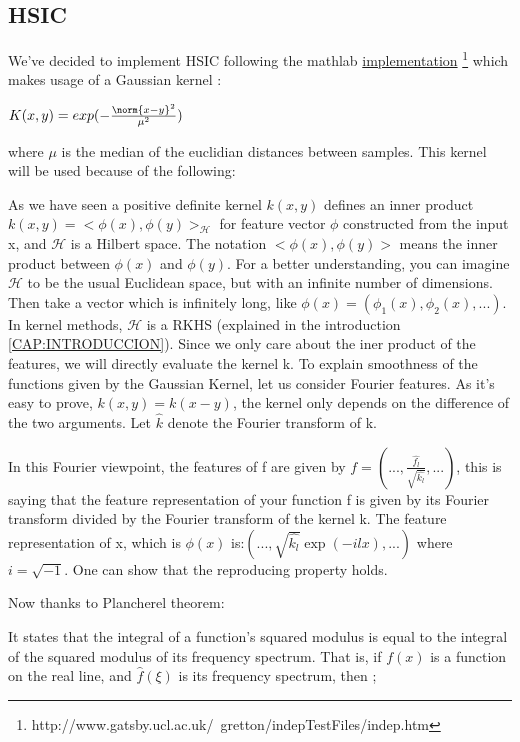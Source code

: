 \subsection{HSIC}

We've decided to implement HSIC following the mathlab \href{http://www.gatsby.ucl.ac.uk/~gretton/indepTestFiles/indep.htm#GreEtAl10}{implementation} \footnote{http://www.gatsby.ucl.ac.uk/~gretton/indepTestFiles/indep.htm} which makes usage of a Gaussian kernel :

$K(x,y) = exp(-\frac{\norm{x-y}^{2}}{\mu^{2}})$

where $\mu$ is the median of the euclidian distances between samples.
This kernel will be used because of the following:

As we have seen a positive definite kernel $k(x,y)$ defines an inner product $k(x,y) = <\phi(x),\phi(y)>_{\mathcal{H}}$ for feature vector $\phi$ constructed from the input x, and $\mathcal{H}$ is a Hilbert space. The notation $<\phi(x),\phi(y)>$ means the inner product between $\phi(x)$ and $\phi(y)$.
For a better understanding, you can imagine $\mathcal{H}$ to be the usual Euclidean space, but with an infinite number of dimensions. Then take a vector which is infinitely long, like $\phi(x) = (\phi_{1}(x),\phi_{2}(x),...)$. In kernel methods, $\mathcal{H}$ is a RKHS (explained in the introduction \ref{CAP:INTRODUCCION}). Since we only care about the iner product of the features, we will directly evaluate the kernel k.
To explain smoothness of the functions given by the Gaussian Kernel, let us consider Fourier features. As it's easy to prove, $k(x,y)=k(x-y)$, the kernel only depends on the difference of the two arguments. Let $\hat{k}$ denote the Fourier transform of k.

In this Fourier viewpoint, the features of f are given by $f = (...,\frac{\hat{f_{l}}}{\sqrt{\hat{k_{l}}}},...)$, this is saying that the feature representation of your function f is given by its Fourier transform divided by the Fourier transform of the kernel k. The feature representation of x, which is $\phi(x)$ is:$(...,\sqrt{\hat{k_{l}}}\exp(-ilx),...)$ where $i = \sqrt{-1}$. One can show that the reproducing property holds.

Now thanks to Plancherel theorem: \cite{plancherel}

It states that the integral of a function's squared modulus is equal to the integral of the squared modulus of its frequency spectrum. That is, if $f(x)$ is a function on the real line, and ${\widehat {f}}(\xi )$ is its frequency spectrum, then ; 

